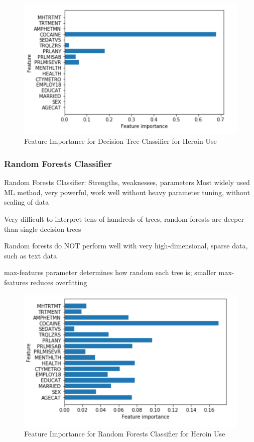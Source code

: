 \documentclass[sigconf]{acmart}
\begin{document}
\begin{figure}[!ht]
  \centering\includegraphics[width=\columnwidth]{images/Figure6.pdf}
  \caption{Feature Importance for Decision Tree Classifier for Heroin Use}
  \label{f:Figure9}
\end{figure}

\subsubsection{Random Forests Classifier}

Random Forests Classifier: Strengths, weaknesses, parameters
Most widely used ML method, very powerful, work well without heavy parameter 
tuning, without scaling of data

Very difficult to interpret tens of hundreds of trees, random forests are deeper 
than single decision trees

Random forests do NOT perform well with very high-dimensional, sparse data, such 
as text data 

max-features parameter determines how random each tree is; smaller max-features 
reduces overfitting

\begin{figure}[!ht]
  \centering\includegraphics[width=\columnwidth]{images/Figure7.pdf}
  \caption{Feature Importance for Random Forests Classifier for Heroin Use}
  \label{f:Figure7}
\end{figure}
\end{document}
